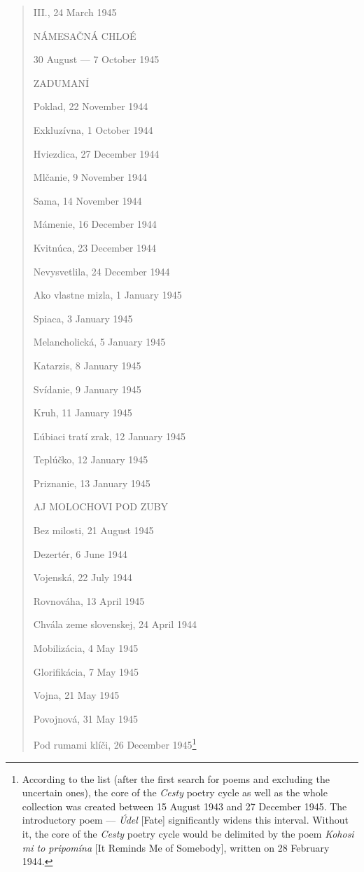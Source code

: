 \documentclass{article}
\begin{document}
\begin{quote}
III., 24 March 1945

\hfill

NÁMESAČNÁ CHLOÉ

30 August –– 7 October 1945

\hfill

ZADUMANÍ

Poklad, 22 November 1944

Exkluzívna, 1 October 1944

Hviezdica, 27 December 1944

Mlčanie, 9 November 1944

Sama, 14 November 1944

Mámenie, 16 December 1944

Kvitnúca, 23 December 1944

Nevysvetlila, 24 December 1944

Ako vlastne mizla, 1 January 1945

Spiaca, 3 January 1945

Melancholická, 5 January 1945

Katarzis, 8 January 1945

Svídanie, 9 January 1945

Kruh, 11 January 1945

Ľúbiaci tratí zrak, 12 January 1945

Teplúčko, 12 January 1945

Priznanie, 13 January 1945

\hfill 

AJ MOLOCHOVI POD ZUBY

Bez milosti, 21 August 1945

Dezertér, 6 June 1944

Vojenská, 22 July 1944

Rovnováha, 13 April 1945

Chvála zeme slovenskej, 24 April 1944

Mobilizácia, 4 May 1945

Glorifikácia, 7 May 1945

Vojna, 21 May 1945

Povojnová, 31 May 1945

Pod rumami klíči, 26 December 1945\footnote{According to the list (after
  the first search for poems and excluding the uncertain ones), the core
  of the \emph{Cesty} poetry cycle as well as the whole collection was
  created between 15 August 1943 and 27 December 1945. The introductory
  poem –– \emph{Údel} [Fate] significantly widens this interval. Without
  it, the core of the \emph{Cesty} poetry cycle would be delimited by
  the poem \emph{Kohosi mi to pripomína} [It Reminds Me of Somebody], written on 28 February 1944.}
\end{quote}
\end{document}
